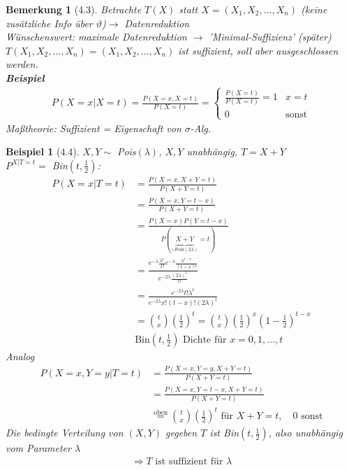 \documentclass[a4paper,openany]{book}
\theoremstyle{mytheoremstyle}
\newtheorem*{bei}{Beispiel}
\newtheorem*{bem}{Bemerkung}
\theoremstyle{mytheoremstyle2}
\begin{document}
\begin{bem}[4.3]
  Betrachte $T(X)$ statt $X=(X_1,X_2,...,X_n )$ (keine zusätzliche Info über $\vartheta $)$\longrightarrow $  Datenreduktion \\
  Wünschenswert: maximale Datenreduktion $\longrightarrow $ 'Minimal-Suffizienz' (später)\\
  $T(X_1,X_2,...,X_n )=(X_1,X_2,...,X_n )$ ist suffizient, soll aber ausgeschlossen werden. \\
  \textbf{Beispiel} 
  \begin{align*}
    P(X=x|X=t)=\frac{P(X=x,X=t)}{P(X=t)}=\begin{cases}
       \frac{P(X=t)}{P(X=t)}=1&x=t\\
       0&\text{sonst}
    \end{cases}
  \end{align*}
  Maßtheorie: %
  Suffizient = Eigenschaft von $\sigma $-Alg. 
\end{bem}
\begin{bei}[4.4]
  $X,Y\sim$ Pois$(\lambda )$, $X,Y$ unabhängig, $T=X+Y$\\
  $P^{X|T=t}=$ Bin$(t,\frac{1}{2})$:
  \begin{align*}
    P(X=x|T=t)
    &=\frac{P(X=x,X+Y=t)}{P(X+Y=t)} \\
    &=\frac{P(X=x,Y=t-x)}{P(X+Y=t)} \\
    &=\frac{P(X=x)P(Y=t-x)}{P(\underbrace{X+Y}_{\sim \text{Pois}(2\lambda)}=t)} \\
    &=\frac{e^{-\lambda }\frac{\lambda ^x}{x!}e^{-\lambda }\frac{\lambda ^{t-x}}{(t-x)!}}{e^{-2 \lambda }\frac{(2 \lambda )^t}{t!}}\\
    &=\frac{e^{-2 \lambda }t!\lambda ^t}{e^{-2 \lambda }x!(t-x)!(2 \lambda )^t} \\
    &=\binom{t}{x}\left(\frac{1}{2}\right)^t=\binom{t}{x}\left(\frac{1}{2}\right)^x \left(1-\frac{1}{2}\right)^{t-x} \\
    & \text{Bin}\left(t,\frac{1}{2}\right) \text{ Dichte für }x=0,1,...,t
  \end{align*}
  Analog 
  \begin{align*}
    P(X=x,Y=y|T=t)
    &=\frac{P(X=x,Y=y,X+Y=t)}{P(X+Y=t)} \\
    &=\frac{P(X=x,Y=t-x,X+Y=t)}{P(X+Y=t)} \\
    &\overset{\text{oben}}=\binom{t}{x}\left(\frac{1}{2}\right)^t \text{ für }X+Y=t, \quad 0 \text{ sonst}
  \end{align*}
  Die bedingte Verteilung von $(X,Y)$ gegeben $T$ ist Bin$\left(t,\frac{1}{2}\right)$, also unabhängig vom Parameter $\lambda $
  \begin{align*}
    \Rightarrow T \text{ ist suffizient für }\lambda 
  \end{align*}
\end{bei}
\end{document}
